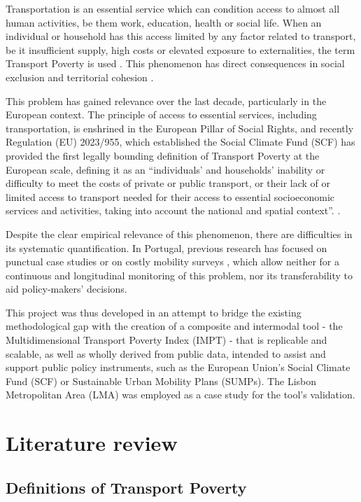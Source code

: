 \documentclass[
  authoryear,
  review,
  1p]{elsarticle}
\begin{document}
Transportation is an essential service which can condition access to
almost all human activities, be them work, education, health or social
life. When an individual or household has this access limited by any
factor related to transport, be it insufficient supply, high costs or
elevated exposure to externalities, the term Transport Poverty is used
\citep{Lucas_2016}. This phenomenon has direct consequences in social
exclusion and territorial cohesion
\citep{MejiaDorantes_MurauskaiteBull_2022}.

This problem has gained relevance over the last decade, particularly in
the European context. The principle of access to essential services,
including transportation, is enshrined in the European Pillar of Social
Rights, and recently Regulation (EU) 2023/955, which established the
Social Climate Fund (SCF) has provided the first legally bounding
definition of Transport Poverty at the European scale, defining it as an
``individuals' and households' inability or difficulty to meet the costs
of private or public transport, or their lack of or limited access to
transport needed for their access to essential socioeconomic services
and activities, taking into account the national and spatial context''.
\citep{EU_2023955} .

Despite the clear empirical relevance of this phenomenon, there are
difficulties in its systematic quantification. In Portugal, previous
research has focused on punctual case studies \citep{Pritchard_2014} or
on costly mobility surveys \citep{INE_IMOB2017}, which allow neither for
a continuous and longitudinal monitoring of this problem, nor its
transferability to aid policy-makers' decisions.

This project was thus developed in an attempt to bridge the existing
methodological gap with the creation of a composite and intermodal tool
- the Multidimensional Transport Poverty Index (IMPT) - that is
replicable and scalable, as well as wholly derived from public data,
intended to assist and support public policy instruments, such as the
European Union's Social Climate Fund (SCF) or Sustainable Urban Mobility
Plans (SUMPs). The Lisbon Metropolitan Area (LMA) was employed as a case
study for the tool's validation.

\section{Literature review}\label{sec-literature_review}

\subsection{Definitions of Transport Poverty}\label{sec-LR_definitions}
\end{document}
